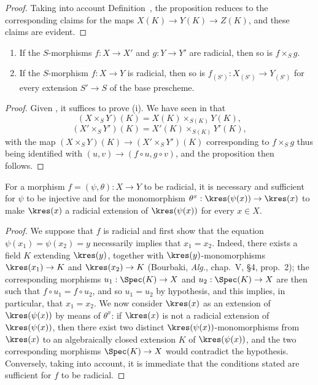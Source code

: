 \begin{proof}
Taking into account Definition~, the proposition reduces to the corresponding claims for the maps $X(K)\to Y(K)\to Z(K)$, and these claims are evident.
\end{proof}

\begin{proposition}[3.5.7]
\label{I.3.5.7}
\medskip\noindent
\begin{enumerate}
  \item[{\rm(i)}] If the $S$-morphisms $f:X\to X'$ and $g:Y\to Y'$ are radicial, then so is $f\times_S g$.
  \item[{\rm(ii)}] If the $S$-morphism $f:X\to Y$ is radicial, then so is $f_{(S')}:X_{(S')}\to Y_{(S')}$ for every extension $S'\to S$ of the base prescheme.
\end{enumerate}
\end{proposition}

\begin{proof}
Given , it suffices to prove (i).
We have seen in  that
\[
  (X\times_S Y)(K)=X(K)\times_{S(K)}Y(K),
\]
\[
  (X'\times_S Y')(K)=X'(K)\times_{S(K)}Y'(K),
\]
with the map $(X\times_S Y)(K)\to(X'\times_S Y')(K)$ corresponding to $f\times_S g$ thus being identified with $(u,v)\to(f\circ u,g\circ v)$, and the proposition then follows.
\end{proof}

\begin{proposition}[3.5.8]
\label{I.3.5.8}
For a morphism $f=(\psi,\theta):X\to Y$ to be radicial, it is necessary and sufficient for $\psi$ to be injective and for the monomorphism $\theta^x:\kres(\psi(x))\to\kres(x)$ to make $\kres(x)$ a radicial extension of $\kres(\psi(x))$ for every $x\in X$.
\end{proposition}

\begin{proof}
We suppose that $f$ is radicial and first show that the equation $\psi(x_1)=\psi(x_2)=y$ necessarily implies that $x_1=x_2$.
Indeed, there exists a field $K$ extending $\kres(y)$, together with $\kres(y)$-monomorphisms $\kres(x_1)\to K$ and $\kres(x_2)\to K$ (Bourbaki, \emph{Alg.}, chap.~V, §4, prop.~2); the corresponding morphisms $u_1:\Spec(K)\to X$ and $u_2:\Spec(K)\to X$ are then such that $f\circ u_1=f\circ u_2$, and so $u_1=u_2$ by hypothesis, and this implies, in particular, that $x_1=x_2$.
We now consider $\kres(x)$ as an extension of $\kres(\psi(x))$ by means of $\theta^x$: if $\kres(x)$ is not a radicial extension of $\kres(\psi(x))$, then there exist two distinct $\kres(\psi(x))$-monomorphisms from $\kres(x)$ to an algebraically closed extension $K$ of $\kres(\psi(x))$, and the two corresponding morphisms $\Spec(K)\to X$ would contradict the hypothesis.
Conversely, taking  into account, it is immediate that the conditions stated are sufficient for $f$ to be radicial.
\end{proof}

